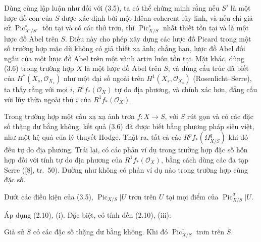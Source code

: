  Dùng cùng lập luận như đối với (3.5), ta có thể chứng
minh rằng nếu $S'$ là một lược đồ con của $S$ được xác định bởi một Iđêan
coherent lũy linh, và nếu chỉ giả sử $\operatorname{Pic}_{X'/S'}^\circ$ tồn
tại và có các thớ trơn, thì $\operatorname{Pic}_{X/S}^\circ$ nhất thiết tồn
tại và là một lược đồ Abel trên $S$. Điều này cho phép xây dựng các lược đồ
Picard trong một số trường hợp mặc dù không có giả thiết xạ ảnh; chẳng hạn,
lược đồ Abel đối ngẫu của một lược đồ Abel trên một vành artin luôn tồn tại.
Mặt khác, dùng (3.6) trong trường hợp $X$ là một lược đồ Abel trên $S$, và dùng
cấu trúc đã biết của $H^*(X_s,\mathcal O_{X_s})$ như một đại số ngoài trên
$H^1(X_s,\mathcal O_{X_s})$ (Rosenlicht--Serre), ta thấy rằng với mọi $i$,
$R^if_*(\mathcal O_X)$ tự do địa phương, và chính xác hơn, đẳng cấu với lũy
thừa ngoài thứ $i$ của $R^1f_*(\mathcal O_X)$.

 Trong trường hợp một cấu xạ xạ ảnh trơn
$f:X\longrightarrow S$, với $S$ rút gọn và có các đặc số thặng dư bằng không,
kết quả (3.6) đã được biết bằng phương pháp siêu việt, như một hệ quả của lý
thuyết Hodge. Thật ra, tất cả các $R^pf_*(\Omega^q_{X/S})$ khi đó đều tự do
địa phương. Trái lại, có các phản ví dụ
trong trường hợp đặc số hỗn hợp đối với tính tự do địa phương của
$R^1f_*(\mathcal O_X)$, bằng cách dùng các đa tạp Serre ([8], tr.~50). Dường
như không có phản ví dụ nào trong trường hợp cùng đặc số.

 Dưới các điều kiện của (3.5),
$\operatorname{Pic}_{X/S}|U$ trơn trên $U$ tại mọi điểm của
$\operatorname{Pic}_{X/S}^\sigma|U$.

Áp dụng (2.10), (i). Đặc biệt, có tính đến (2.10), (iii):

 Giả sử $S$ có các đặc số thặng dư bằng không. Khi đó
$\operatorname{Pic}_{X/S}^\tau$ trơn trên $S$.

